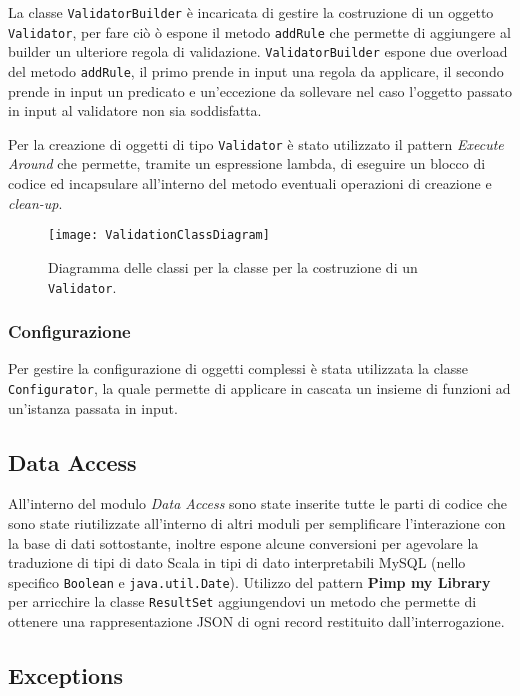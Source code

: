 La classe \texttt{ValidatorBuilder} \`e incaricata di gestire la costruzione di un oggetto \texttt{Validator}, per fare ciò \`o espone il metodo \texttt{addRule} che permette di aggiungere al builder un ulteriore regola di validazione.
%
\texttt{ValidatorBuilder} espone due overload del metodo \texttt{addRule}, il primo prende in input una regola da applicare, il secondo prende in input un predicato e un'eccezione da sollevare nel caso l'oggetto passato in input al validatore non sia soddisfatta.

Per la creazione di oggetti di tipo \texttt{Validator} \`e stato utilizzato il pattern \textit{Execute Around} che permette, tramite un espressione lambda, di eseguire un blocco di codice ed incapsulare all'interno del metodo eventuali operazioni di creazione e \textit{clean-up}.

\begin{figure}[H]
  \centering
    \texttt{[image: ValidationClassDiagram]}
  \caption{Diagramma delle classi per la classe per la costruzione di un \texttt{Validator}.}
\end{figure}

\subsubsection{Configurazione}

Per gestire la configurazione di oggetti complessi è stata utilizzata la classe \texttt{Configurator}, la quale permette di applicare in cascata un insieme di funzioni ad un'istanza passata in input.

\subsection{Data Access}

All'interno del modulo \textit{Data Access} sono state inserite tutte le parti di codice che sono state riutilizzate all'interno di altri moduli per semplificare l'interazione con la base di dati sottostante, inoltre espone alcune conversioni per agevolare la traduzione di tipi di dato Scala in tipi di dato interpretabili MySQL (nello specifico \texttt{Boolean} e \texttt{java.util.Date}).
%
Utilizzo del pattern \textbf{Pimp my Library} per arricchire la classe \texttt{ResultSet} aggiungendovi un metodo che permette di ottenere una rappresentazione JSON di ogni record restituito dall'interrogazione.

\subsection{Exceptions}

